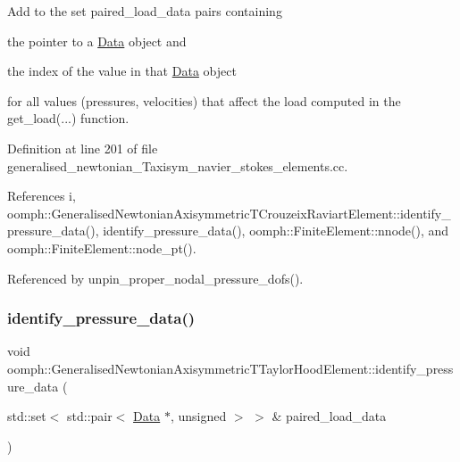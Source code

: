 Add to the set {\ttfamily paired\+\_\+load\+\_\+data} pairs containing
\begin{DoxyItemize}
\item the pointer to a \hyperlink{classoomph_1_1Data}{Data} object and
\item the index of the value in that \hyperlink{classoomph_1_1Data}{Data} object
\end{DoxyItemize}for all values (pressures, velocities) that affect the load computed in the {\ttfamily get\+\_\+load}(...) function. 

Definition at line 201 of file generalised\+\_\+newtonian\+\_\+\+Taxisym\+\_\+navier\+\_\+stokes\+\_\+elements.\+cc.



References i, oomph\+::\+Generalised\+Newtonian\+Axisymmetric\+T\+Crouzeix\+Raviart\+Element\+::identify\+\_\+pressure\+\_\+data(), identify\+\_\+pressure\+\_\+data(), oomph\+::\+Finite\+Element\+::nnode(), and oomph\+::\+Finite\+Element\+::node\+\_\+pt().



Referenced by unpin\+\_\+proper\+\_\+nodal\+\_\+pressure\+\_\+dofs().

\mbox{\label{classoomph_1_1GeneralisedNewtonianAxisymmetricTTaylorHoodElement_aa33e3b4641824ea7516c5e98beeb9e1f}} 
\subsubsection{\texorpdfstring{identify\+\_\+pressure\+\_\+data()}{identify\_pressure\_data()}}
{\footnotesize\ttfamily void oomph\+::\+Generalised\+Newtonian\+Axisymmetric\+T\+Taylor\+Hood\+Element\+::identify\+\_\+pressure\+\_\+data (\begin{DoxyParamCaption}\item[{std\+::set$<$ std\+::pair$<$ \hyperlink{classoomph_1_1Data}{Data} $\ast$, unsigned $>$ $>$ \&}]{paired\+\_\+load\+\_\+data }\end{DoxyParamCaption})}



